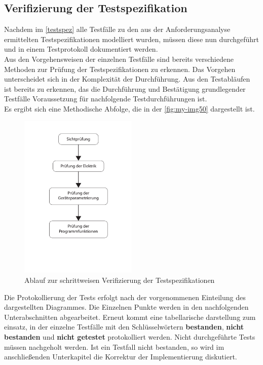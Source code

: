\documentclass[../../../Bachelorarbeit.tex]{subfiles}
\begin{document}
\subsection{Verifizierung der Testspezifikation}
Nachdem im \autoref{testspez} alle Testfälle zu den aus der Anforderungsanalyse ermittelten Testspezifikationen modelliert wurden, müssen diese nun durchgeführt und in einem Testprotokoll dokumentiert werden.\\
Aus den Vorgehensweisen der einzelnen Testfälle sind bereits verschiedene Methoden zur Prüfung der Testspezifikationen zu erkennen. Das Vorgehen unterscheidet sich in der Komplexität der Durchführung. Aus den Testabläufen ist bereits zu erkennen, das die Durchführung und Bestätigung grundlegender Testfälle Voraussetzung für nachfolgende Testdurchführungen ist. \\
Es ergibt sich eine Methodische Abfolge, die in der \autoref{fig:my-img50} dargestellt ist.

\begin{figure}[H]
    \centering
    \includegraphics[width=0.5\textwidth]{Images/pruefablauf.pdf}
    \caption[Prüfablauf]{Ablauf zur schrittweisen Verifizierung der Testspezifikationen}
    \label{fig:my-img50}
\end{figure}

Die Protokollierung der Tests erfolgt nach der vorgenommenen Einteilung des dargestellten Diagrammes. Die Einzelnen Punkte werden in den nachfolgenden Unterabschnitten abgearbeitet. Erneut kommt eine tabellarische darstellung zum einsatz, in der einzelne Testfälle mit den Schlüsselwörtern \textbf{bestanden}, \textbf{nicht bestanden} und \textbf{nicht getestet} protokolliert werden. Nicht durchgeführte Tests müssen nachgeholt werden. Ist ein Testfall nicht bestanden, so wird im anschließenden Unterkapitel die Korrektur der Implementierung diskutiert.
\end{document}
